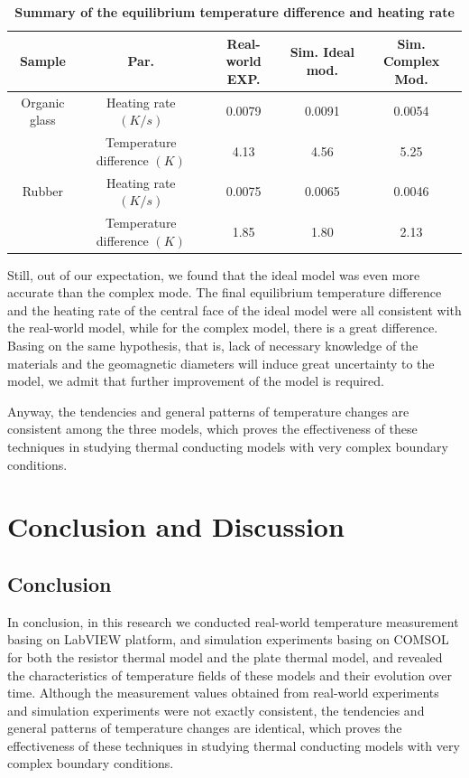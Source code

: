 \documentclass[10pt,a4paper,twocolumn,twoside,UTF8]{article}
\begin{document}
	\begin{table}[htbp]
	\centering
	\caption{\textbf{Summary of the equilibrium temperature difference and heating rate}}
	\label{tab.2}
		\begin{tabular}{ccccc}
			\toprule
			Sample & Par. & Real-world EXP. & Sim. Ideal mod. & Sim. Complex Mod. \\
			\midrule
			Organic glass & Heating rate $(K/s)$ & 0.0079 & 0.0091 & 0.0054 \\
			~ & Temperature difference $(K)$ & 4.13 & 4.56 & 5.25 \\
			Rubber & Heating rate $(K/s)$ & 0.0075 & 0.0065 & 0.0046 \\
			~ & Temperature difference $(K)$ & 1.85 & 1.80 & 2.13 \\
			\bottomrule
		\end{tabular}
	\end{table}

	Still, out of our expectation, we found that the ideal model was even more accurate than the complex mode. 
	The final equilibrium temperature difference and the heating rate of the central face of the ideal model were all consistent with the real-world model, 
	while for the complex model, there is a great difference.
	Basing on the same hypothesis, that is, lack of necessary knowledge of the materials and the geomagnetic diameters will induce great uncertainty to the model,
	we admit that further improvement of the model is required.

	Anyway, the tendencies and general patterns of temperature changes are consistent among the three models, 
	which proves the effectiveness of these techniques in studying thermal conducting models with very complex boundary conditions.


\section{Conclusion and Discussion}
	\subsection{Conclusion}
	In conclusion, in this research we conducted real-world temperature measurement basing on LabVIEW platform, and simulation experiments basing on COMSOL for both the resistor thermal model and the plate thermal model, 
	and revealed the characteristics of temperature fields of these models and their evolution over time. 
	Although the measurement values obtained from real-world experiments and simulation experiments were not exactly consistent, 
	the tendencies and general patterns of temperature changes are identical, which proves the effectiveness of these techniques in studying thermal conducting models with very complex boundary conditions.
\end{document}
